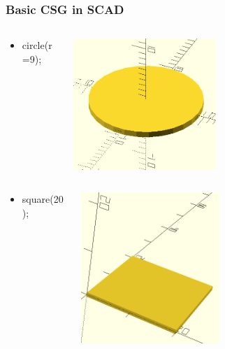 \documentclass{beamer}
\begin{document}
\begin{frame}
\frametitle{Basic CSG in SCAD}
\begin{columns}
  \begin{column}{0.5\textwidth}
    \begin{itemize}
    \item circle(r=9);
    \end{itemize}
  \end{column}
  \begin{column}{0.5\textwidth}
    \includegraphics[width=0.5\textwidth, right]{openscad-circle_9.png}
  \end{column}
\end{columns}
\begin{columns}
  \begin{column}{0.5\textwidth}
    \begin{itemize}
    \item square(20);
    \end{itemize}
  \end{column}
  \begin{column}{0.5\textwidth}
    \includegraphics[width=0.5\textwidth, right]{openscad-square_20.png}
  \end{column}
\end{columns}
\end{frame}
\end{document}

